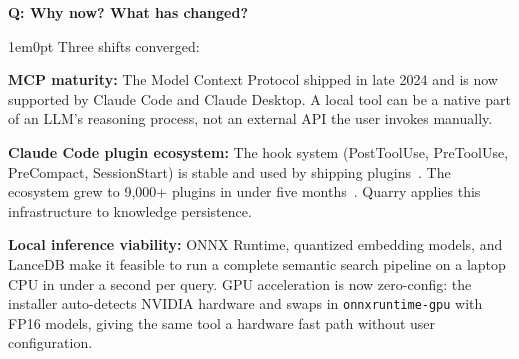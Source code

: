 \documentclass[11pt,letterpaper]{article}
\newcounter{faqnum}
\newenvironment{faqpair}[1]{%
  \needspace{4\baselineskip}%
  \vspace{0.5em}%
  \refstepcounter{faqnum}%
  \noindent\textbf{\color{SectionBlue}Q\thefaqnum: #1}\par\nopagebreak[4]%
  \vspace{0.2em}%
  \begin{adjustwidth}{1em}{0pt}%
  \setlength{\parindent}{0pt}%
}{%
  \end{adjustwidth}%
  \vspace{0.5em}%
}
\begin{document}
\begin{faqpair}{Why now? What has changed?}\label{faq:why-now}
  Three shifts converged:

  \textbf{MCP maturity:} The Model Context Protocol shipped in late 2024 and is
  now supported by Claude Code and Claude Desktop. A local tool can be a native
  part of an LLM's reasoning process, not an external API the user invokes
  manually.

  \textbf{Claude Code plugin ecosystem:} The hook system (PostToolUse,
  PreToolUse, PreCompact, SessionStart) is stable and used by shipping
  plugins~\cite{claude-code-hooks}. The ecosystem grew to 9{,}000+ plugins in
  under five months~\cite{startuphub2025claudeplugins}. Quarry applies this
  infrastructure to knowledge persistence.

  \textbf{Local inference viability:} ONNX Runtime, quantized embedding models,
  and LanceDB make it feasible to run a complete semantic search pipeline on a
  laptop CPU in under a second per query. GPU acceleration is now zero-config:
  the installer auto-detects NVIDIA hardware and swaps in
  \texttt{onnxruntime-gpu} with FP16 models, giving the same tool a hardware
  fast path without user configuration.
\end{faqpair}
\end{document}

